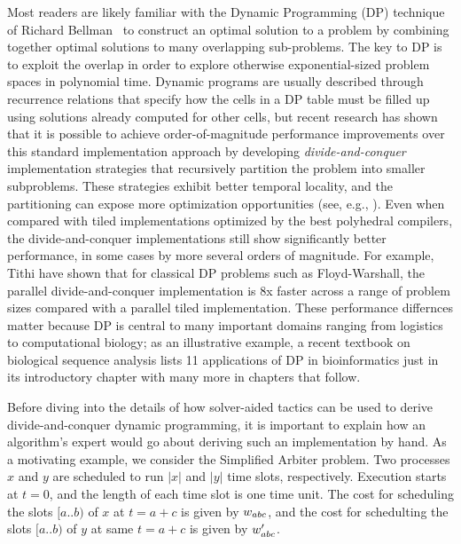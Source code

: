 Most readers are likely familiar with the Dynamic Programming (DP) technique of Richard Bellman~\cite{bellman} to construct an optimal solution to a problem by combining together optimal solutions to many overlapping sub-problems. The key to DP is to exploit the overlap in order to explore otherwise exponential-sized problem spaces in polynomial time. Dynamic programs are usually described through recurrence relations that specify how the cells in a DP table must be filled up using solutions already computed for other cells, but recent research has shown that it is possible to achieve order-of-magnitude performance improvements over this standard implementation approach by developing \emph{divide-and-conquer}  implementation strategies that recursively
partition the problem into smaller subproblems.  These strategies exhibit better temporal locality, and the partitioning can expose more
optimization opportunities (see, e.g., \cite{IPDPS15/Tithi}).  Even when compared with tiled implementations optimized by the best polyhedral compilers, 
the divide-and-conquer implementations still show significantly better performance, in some cases by more several orders of magnitude. For example, Tithi \etal{} have shown that for classical DP problems such as Floyd-Warshall, the parallel divide-and-conquer implementation is  8x faster  across a range of problem sizes compared with a parallel tiled implementation\cite{IPDPS15/Tithi}. These performance differnces matter because  DP is central to many important domains ranging from logistics to computational biology; as an illustrative example, a recent textbook \cite{DurbinEdKr98} on biological sequence analysis lists 11 applications of DP in bioinformatics just in its introductory chapter with many more in chapters that follow.



Before diving into the details of how solver-aided tactics can be used to derive divide-and-conquer dynamic programming, it is important to explain how an algorithm's expert would go about deriving such an implementation by hand.
As a motivating example, we consider the Simplified Arbiter problem.
Two processes $x$ and $y$ are scheduled to run $|x|$ and $|y|$ time slots,
respectively. Execution starts at $t=0$, and the length of each time slot is
one time unit. The cost for scheduling the slots $[a..b)$ of $x$ at $t=a+c$
is given by $w_{abc}$, and the cost for schedulting the slots $[a..b)$ of $y$
at same $t=a+c$ is given by $w'_{abc}$.

